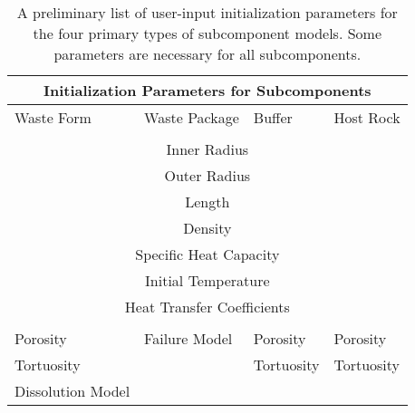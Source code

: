 %
\begin{table}
  \centering
  \footnotesize{
  \begin{tabularx}{\textwidth}{|l|l|l|l|}
    \multicolumn{4}{c}{\textbf{Initialization Parameters for Subcomponents}}\\
    \hline
    Waste Form & Waste Package & Buffer & Host Rock \\
    \hline
    \multicolumn{4}{|c|}{}\\
    \multicolumn{4}{|c|}{Inner Radius}\\
    \multicolumn{4}{|c|}{Outer Radius}\\
    \multicolumn{4}{|c|}{Length}\\
    \multicolumn{4}{|c|}{Density}\\
    \multicolumn{4}{|c|}{Specific Heat Capacity}\\
    \multicolumn{4}{|c|}{Initial Temperature}\\
    \multicolumn{4}{|c|}{Heat Transfer Coefficients}\\
    \multicolumn{4}{|c|}{}\\
    \hline
    Porosity           &  Failure Model & Porosity & Porosity \\
    Tortuosity         &                & Tortuosity & Tortuosity \\
    Dissolution Model  &                &           &  \\
    \hline
  \end{tabularx}
  \caption[Initialization Parameters for Subcomponents]{A preliminary list of 
  user-input initialization parameters for the four primary types of 
  subcomponent models. Some parameters are necessary for all subcomponents.}
  \label{tab:params}
  }
\end{table}


